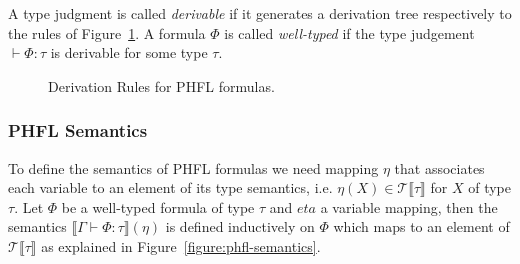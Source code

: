 A type judgment is called \textit{derivable} if it generates a derivation tree respectively to the rules of
Figure~\ref{figure:phfl-typing-rules}. A formula $\Phi$ is called \textit{well-typed} if the type
judgement $\vdash \Phi:\tau$ is derivable for some type $\tau$.

\begin{figure}
    \caption{Derivation Rules for PHFL formulas.}
    \label{figure:phfl-typing-rules}
\end{figure}

\subsubsection{PHFL Semantics}

To define the semantics of PHFL formulas we need mapping $\eta$ that associates each variable to an element of its
type semantics, i.e. $\eta(X) \in \mathcal{T}\llbracket\tau\rrbracket$ for $X$ of type $\tau$. Let $\Phi$ be a
well-typed formula of type $\tau$ and $eta$ a variable mapping, then the semantics $\llbracket\Gamma \vdash \Phi
\colon \tau \rrbracket(\eta)$ is defined inductively on $\Phi$ which maps to an element of
$\mathcal{T}\llbracket\tau\rrbracket$ as explained in Figure~\ref{figure:phfl-semantics}.

